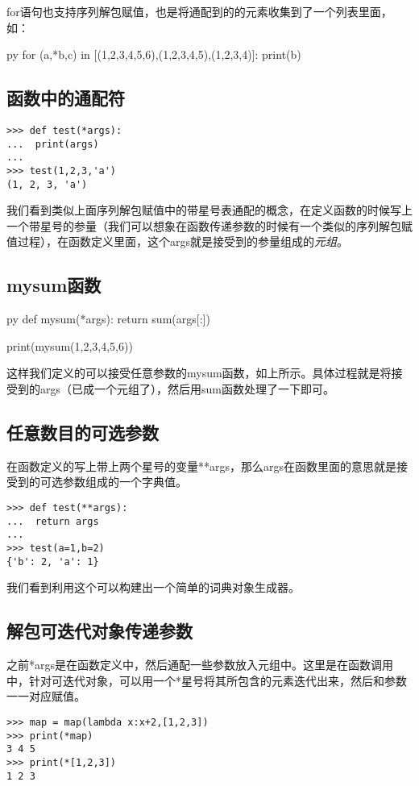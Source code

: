 \documentclass[12pt,oneside]{book}
\begin{document}
\begin{common-format}
for语句也支持序列解包赋值，也是将通配到的的元素收集到了一个列表里面，如：
\begin{xverbatim}[129]{py}
for (a,*b,c) in [(1,2,3,4,5,6),(1,2,3,4,5),(1,2,3,4)]:
    print(b)
\end{xverbatim}


\subsection{函数中的通配符}
\begin{Verbatim}
>>> def test(*args):
...  print(args)
... 
>>> test(1,2,3,'a')
(1, 2, 3, 'a')
\end{Verbatim}
我们看到类似上面序列解包赋值中的带星号表通配的概念，在定义函数的时候写上一个带星号的参量（我们可以想象在函数传递参数的时候有一个类似的序列解包赋值过程），在函数定义里面，这个args就是接受到的参量组成的\emph{元组}。


\subsection{mysum函数}
\begin{xverbatim}[129]{py}
def mysum(*args):
    return sum(args[:])

print(mysum(1,2,3,4,5,6))
\end{xverbatim}
这样我们定义的可以接受任意参数的mysum函数，如上所示。具体过程就是将接受到的args（已成一个元组了），然后用sum函数处理了一下即可。


\subsection{任意数目的可选参数}
在函数定义的写上带上两个星号的变量**args，那么args在函数里面的意思就是接受到的可选参数组成的一个字典值。
\begin{Verbatim}
>>> def test(**args):
...  return args
... 
>>> test(a=1,b=2)
{'b': 2, 'a': 1}
\end{Verbatim}

我们看到利用这个可以构建出一个简单的词典对象生成器。

\subsection{解包可迭代对象传递参数}
之前*args是在函数定义中，然后通配一些参数放入元组中。这里是在函数调用中，针对可迭代对象，可以用一个*星号将其所包含的元素迭代出来，然后和参数一一对应赋值。
\begin{Verbatim}
>>> map = map(lambda x:x+2,[1,2,3])
>>> print(*map)
3 4 5
>>> print(*[1,2,3])
1 2 3
\end{Verbatim}


\end{common-format}
\end{document}
